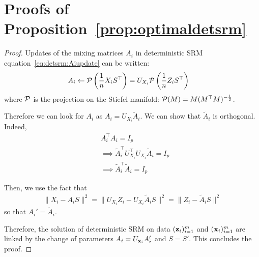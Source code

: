 \documentclass{article}
\begin{document}
\section{Proofs of Proposition~\ref{prop:optimaldetsrm}}
\label{proof:deterministic}

\begin{proof}
Updates of the mixing matrices $A_i$ in deterministic SRM
equation~\eqref{eq:detsrm:Aiupdate} can be written:
\begin{align}
  A_i &\leftarrow \mathcal{P} \left(\frac1{n}X_i S^{\top} \right)= U_{X_i}\mathcal{P} \left(\frac1{n}Z_i S^{\top} \right)
  \label{eq:fastdetsrm:Aiupdate}
\end{align}
where $\mathcal{P}$ is the projection on the Stiefel manifold: $\mathcal{P}(M) = M
(M^{\top}M)^{-\frac12}$.
%

Therefore we can look for $A_i$ as $A_i = U_{X_i} \tilde{A}_i$.
%
We can show that $\tilde{A}_i$ is orthogonal.
%
Indeed,
\begin{align}
  &A_i^{\top} A_i = I_p \\
  & \implies \tilde{A}_i^{\top}U_{X_i}^{\top} U_{X_i} \tilde{A}_i = I_p \\
  & \implies \tilde{A}_i^{\top} \tilde{A}_i = I_p
\end{align}

Then, we use the fact that
\begin{align}
  \|X_i - A_i S \|^2 = \| U_{X_i}Z_i - U_{X_i}\tilde{A}_i S\|^2 = \| Z_i - \tilde{A}_i S \|^2
  \label{eq:equality:xy}
\end{align}
so that $A_i' = \tilde{A}_i$.
%


Therefore, the solution of deterministic SRM on data $(\mathbf{z}_i)_{i=1}^m$ and
$(\mathbf{x}_i)_{i=1}^m$ are linked by the change of parameters $A_i = U_{\mathbf{x}_i}A_i'$ and
$S = S'$.
%
This concludes the proof.
%

\end{proof}
\end{document}
